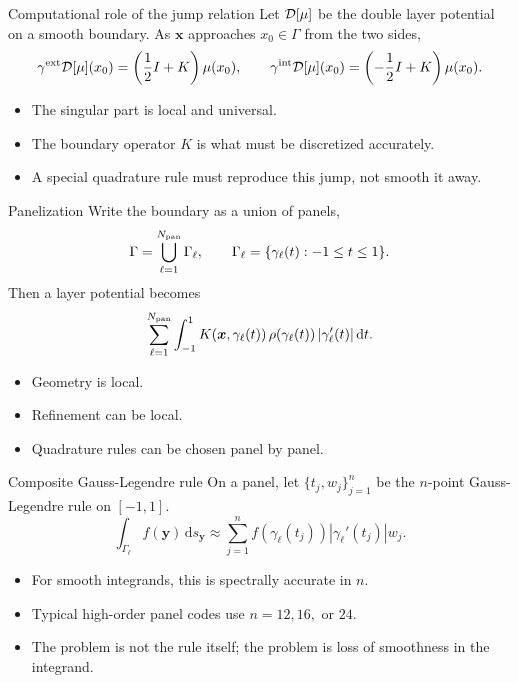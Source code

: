 \documentclass[aspectratio=169,11pt]{beamer}
\newcommand{\dd}{\,\mathrm d}
\newcommand{\x}{\bm{x}}
\newcommand{\y}{\bm{y}}
\begin{document}
\begin{frame}{Computational role of the jump relation}
\small
Let $\mathcal{D}[\mu]$ be the double layer potential on a smooth boundary.
As $\x$ approaches $x_0\in\Gamma$ from the two sides,
\[
  \gamma^{\rm ext}\mathcal{D}[\mu](x_0)=
  \left(\frac12 I+K\right)\mu(x_0),
  \qquad
  \gamma^{\rm int}\mathcal{D}[\mu](x_0)=
  \left(-\frac12 I+K\right)\mu(x_0).
\]

\begin{itemize}
  \item The singular part is local and universal.
  \item The boundary operator $K$ is what must be discretized accurately.
  \item A special quadrature rule must reproduce this jump, not smooth it away.
\end{itemize}
\end{frame}

\begin{frame}{Panelization}
\small
Write the boundary as a union of panels,
\[
  \Gamma=\bigcup_{\ell=1}^{N_{\rm pan}}\Gamma_\ell,\qquad
  \Gamma_\ell=\{\gamma_\ell(t):-1\le t\le1\}.
\]
Then a layer potential becomes
\[
  \sum_{\ell=1}^{N_{\rm pan}}
  \int_{-1}^1
  K(\x,\gamma_\ell(t))\,\rho(\gamma_\ell(t))\,|\gamma_\ell'(t)|\dd t.
\]

\begin{itemize}
  \item Geometry is local.
  \item Refinement can be local.
  \item Quadrature rules can be chosen panel by panel.
\end{itemize}
\end{frame}

\begin{frame}{Composite Gauss-Legendre rule}
\small
On a panel, let $\{t_j,w_j\}_{j=1}^n$ be the $n$-point Gauss-Legendre rule on $[-1,1]$.
\[
  \int_{\Gamma_\ell} f(\y)\dd s_{\y}
  \approx
  \sum_{j=1}^n
  f(\gamma_\ell(t_j))|\gamma_\ell'(t_j)|w_j.
\]

\begin{itemize}
  \item For smooth integrands, this is spectrally accurate in $n$.
  \item Typical high-order panel codes use $n=12,16,$ or $24$.
  \item The problem is not the rule itself; the problem is loss of smoothness in the integrand.
\end{itemize}
\end{frame}
\end{document}

